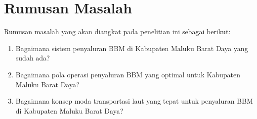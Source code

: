 \section{Rumusan Masalah}
\label{sec:rumusan masalah}

Rumusan masalah yang akan diangkat pada penelitian ini sebagai berikut:
\begin{enumerate}
    \item Bagaimana sistem penyaluran BBM di Kabupaten Maluku Barat Daya yang sudah ada?
    \item Bagaimana pola operasi penyaluran BBM yang optimal untuk Kabupaten Maluku Barat Daya?
    \item  Bagaimana konsep moda transportasi laut yang tepat untuk penyaluran BBM di Kabupaten Maluku Barat Daya?
\end{enumerate}
